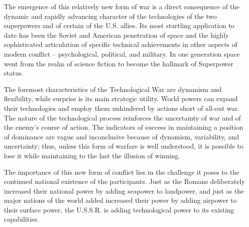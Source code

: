 The emergence of this relatively new form of war is a direct consequence of the dynamic and rapidly advancing character of the technologies of the two superpowers and of certain of the U.S. allies. Its most startling application to date has been the Soviet and American penetration of space and the highly sophisticated articulation of specific technical achievements in other aspects of modern conflict -- psychological, political, and military. In one generation space went from the realm of science fiction to become the hallmark of Superpower status.

The foremost characteristics of the Technological War are dynamism and flexibility, while surprise is its main strategic utility. World powers can expand their technologies and employ them unhindered by actions short of all-out war. The nature of the technological process reinforces the uncertainty of war and of the enemy's course of action. The indicators of success in maintaining a position of dominance are vague and inconclusive because of dynamism, variability, and uncertainty; thus, unless this form of warfare is well understood, it is possible to lose it while maintaining to the last the illusion of winning.

The importance of this new form of conflict lies in the challenge it poses to the continued national existence of the participants. Just as the Romans deliberately increased their national power by adding seapower to landpower, and just as the major nations of the world added increased their power by adding airpower to their surface power, the U.S.S.R. is adding technological power to its existing capabilities.

